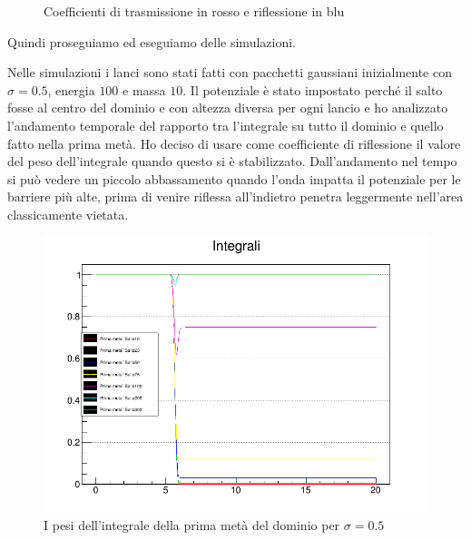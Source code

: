 \begin{figure}[h]
  \centering
  \caption{Coefficienti di trasmissione in rosso e riflessione in blu}
\end{figure}

Quindi proseguiamo ed eseguiamo delle simulazioni.

Nelle simulazioni i lanci sono stati fatti con pacchetti gaussiani inizialmente con $\sigma=0.5$, energia $100$ e massa $10$. Il potenziale \`e stato impostato perch\'e il salto fosse al centro del dominio e con altezza diversa per ogni lancio e ho analizzato l'andamento temporale del rapporto tra l'integrale su tutto il dominio e quello fatto nella prima met\`a.
Ho deciso di usare come coefficiente di riflessione il valore del peso dell'integrale quando questo si \`e stabilizzato.
Dall'andamento nel tempo si pu\`o vedere un piccolo abbassamento quando l'onda impatta il potenziale per le barriere pi\`u alte, prima di venire riflessa all'indietro penetra leggermente nell'area classicamente vietata.

\begin{figure}[htb]
  \centering
  \includegraphics[width=0.7\linewidth]{IMG/SaltoR}
  \caption{I pesi dell'integrale della prima met\`a del dominio per $\sigma=0.5$}\label{fig:SaltoR}
\end{figure}

